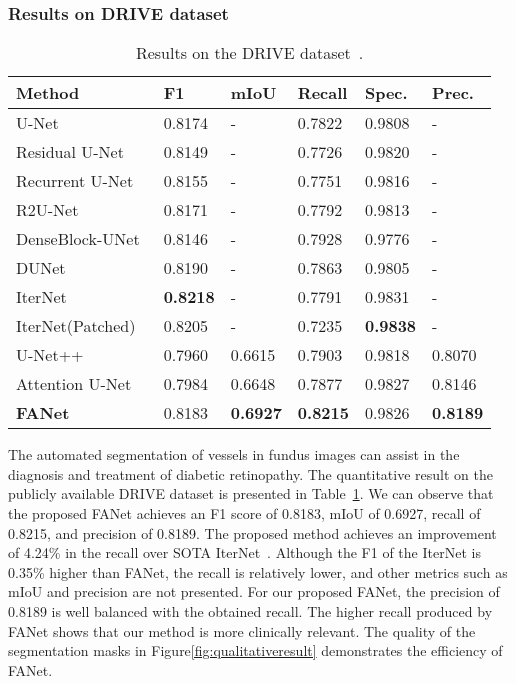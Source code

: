 \documentclass[journal]{IEEEtran}
\begin{document}
\subsubsection{Results on DRIVE dataset}
\begin{table}[!t]
\footnotesize
\centering
\caption{Results on the DRIVE dataset~\cite{staal2004ridge}.}
\begin{tabular}{@{}l|l|l|l|l|l@{}}
\toprule
\textbf{Method} & \textbf{F1} & \textbf{mIoU} & \textbf{Recall}& \textbf{Spec.} & \textbf{Prec.} \\ 
\midrule
U-Net~\cite{ronneberger2015u} & 0.8174 & - & 0.7822 & 0.9808 & - \\ Residual U-Net~\cite{alom2018recurrent} & 0.8149 & - & 0.7726 & 0.9820 & - \\ Recurrent U-Net~\cite{alom2018recurrent}  & 0.8155 & - & 0.7751 & 0.9816 & - \\ R2U-Net~\cite{alom2018recurrent} &0.8171 & - &0.7792 &0.9813 & - \\ DenseBlock-UNet~\cite{yao2020eye3dvas} &0.8146 & - &0.7928 &0.9776 & - \\ DUNet~\cite{jin2019dunet} & 0.8190 & - &0.7863 &0.9805 & - \\ IterNet~\cite{li2020iternet} &\textbf{0.8218} &- &0.7791 &0.9831 & -  \\ IterNet(Patched)~\cite{li2020iternet} &0.8205 &-  &0.7235 & \textbf{0.9838} &- \\ U-Net++~\cite{zhou2018unet++} &0.7960 &0.6615 &0.7903 &0.9818 &0.8070 \\ Attention U-Net~\cite{oktay2018attention} &0.7984 &0.6648 &0.7877 &0.9827 &0.8146 \\ \textbf{FANet} &0.8183 & \textbf{0.6927} & \textbf{0.8215} &0.9826 & \textbf{0.8189} \\ \bottomrule
\end{tabular}
\label{tab:Drivedataset}
\end{table}

The automated segmentation of vessels in fundus images can assist in the diagnosis and treatment of diabetic retinopathy. The quantitative result on the publicly available DRIVE dataset is presented in Table~\ref{tab:Drivedataset}. We can observe that the proposed FANet achieves an F1 score of 0.8183, \ac{mIoU} of 0.6927, recall of 0.8215, and precision of 0.8189. The proposed method achieves an improvement of 4.24\% in the recall over \ac{SOTA} IterNet~\cite{li2020iternet}. Although the F1 of the IterNet is 0.35\% higher than FANet, the recall is relatively lower, and other metrics such as \ac{mIoU} and precision are not presented. For our proposed FANet, the precision of 0.8189 is well balanced with the obtained recall. The higher recall produced by FANet shows that our method is more clinically relevant. The quality of the segmentation masks in Figure\ref{fig:qualitativeresult} demonstrates the efficiency of FANet. 
\end{document}
